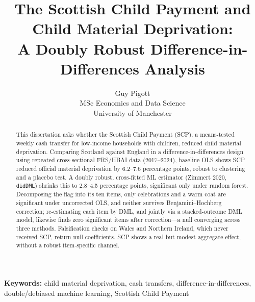 \documentclass[12pt,a4paper]{article}
\title{The Scottish Child Payment and Child Material Deprivation: \\ A Doubly Robust Difference-in-Differences Analysis}
\author{Guy Pigott \\ MSc Economics and Data Science \\ University of Manchester}
\date{}
\begin{document}
\maketitle

\begin{abstract}
\noindent
This dissertation asks whether the Scottish Child Payment (SCP), a means-tested weekly cash transfer for low-income households with children, reduced child material deprivation. Comparing Scotland against England in a difference-in-differences design using repeated cross-sectional FRS/HBAI data (2017--2024), baseline OLS shows SCP reduced official material deprivation by 6.2--7.6 percentage points, robust to clustering and a placebo test. A doubly robust, cross-fitted ML estimator (Zimmert 2020, \texttt{didDML}) shrinks this to 2.8--4.5 percentage points, significant only under random forest. Decomposing the flag into its ten items, only celebrations and a warm coat are significant under uncorrected OLS, and neither survives Benjamini--Hochberg correction; re-estimating each item by DML, and jointly via a stacked-outcome DML model, likewise finds zero significant items after correction---a null converging across three methods. Falsification checks on Wales and Northern Ireland, which never received SCP, return null coefficients. SCP shows a real but modest aggregate effect, without a robust item-specific channel.
\end{abstract}

\vspace{1em}
\noindent\textbf{Keywords:} child material deprivation, cash transfers, difference-in-differences, double/debiased machine learning, Scottish Child Payment

\clearpage
\tableofcontents
\clearpage



\end{document}
